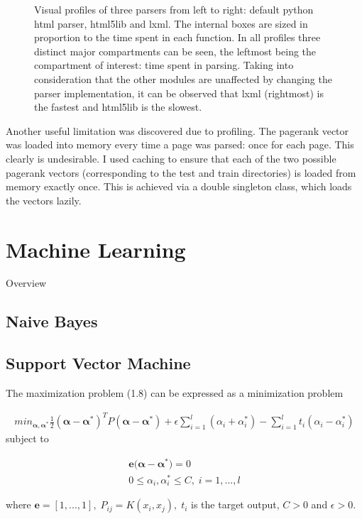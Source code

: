 \documentclass[12pt,twoside,notitlepage]{report}
\begin{document}
\begin{figure}
\begin{minipage}{.3\textwidth}
  \label{fig:test2}
\end{minipage}
\caption{Visual profiles of three parsers from left to right: default python
html parser, html5lib and lxml. The internal boxes are sized in proportion to
the time spent in each function. In all profiles three distinct major
compartments can be seen, the leftmost being the compartment of interest: 
time spent in parsing. Taking into consideration that the other modules are unaffected by changing the parser
implementation, it can be observed that lxml (rightmost) is the fastest and
html5lib is the slowest.\label{parsers}}
\end{figure}

Another useful limitation was discovered due to profiling. The pagerank vector
was loaded into memory every time a page was parsed: once for each page. This
clearly is undesirable. I used caching to ensure that each of the two possible
pagerank vectors (corresponding to the test and train directories) is loaded
from memory exactly once. This is achieved via a double singleton class, which
loads the vectors lazily.
\section{Machine Learning}
Overview
\subsection{Naive Bayes}

\subsection{Support Vector Machine}

The maximization problem (1.8) can be expressed as a minimization problem

\begin{gather}
  min_{\bm{\alpha},\bm{\alpha^*}} \frac{1}{2}(\bm{\alpha-\alpha^*})^T P (\bm{\alpha - \alpha^*})+\epsilon 
\sum_{i=1}^{l}(\alpha_i+\alpha_i^*)-\sum_{i=1}^{l}t_i(\alpha_i-\alpha_i^*)
\end{gather}
subject to

\begin{gather}
  \mathbf{e(\bm{\alpha}}-\bm{\alpha^*})=0 \\
  0\leq \alpha_i,\alpha_i^* \leq C, \;i=1,...,l
 \end{gather}

where
\(\mathbf{e}=[1,...,1],\;P_{ij}=K(x_i,x_j),\;t_i\) is the target output, \(C > 0\) and \(\epsilon > 0.\)
\end{document}
